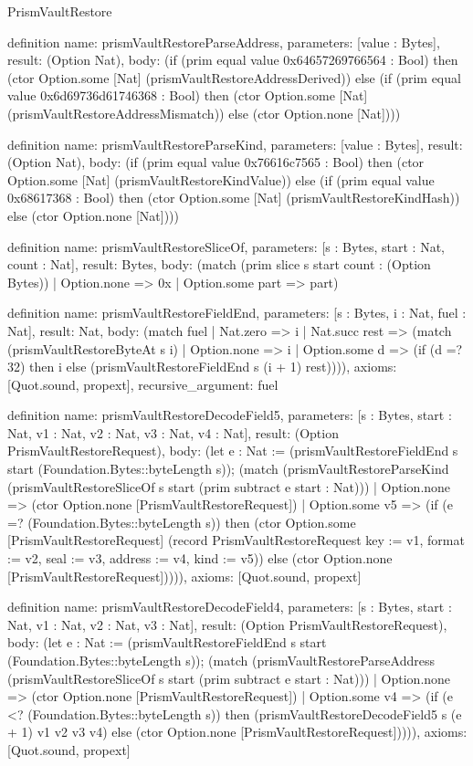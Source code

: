 \begin{lexlean}{PrismVaultRestore}
\begin{semanticmodule}
definition{
  name: prismVaultRestoreParseAddress,
  parameters: [value : Bytes],
  result: (Option Nat),
  body: (if (prim equal value 0x64657269766564 : Bool) then (ctor Option.some [Nat] (prismVaultRestoreAddressDerived)) else (if (prim equal value 0x6d69736d61746368 : Bool) then (ctor Option.some [Nat] (prismVaultRestoreAddressMismatch)) else (ctor Option.none [Nat])))
}

definition{
  name: prismVaultRestoreParseKind,
  parameters: [value : Bytes],
  result: (Option Nat),
  body: (if (prim equal value 0x76616c7565 : Bool) then (ctor Option.some [Nat] (prismVaultRestoreKindValue)) else (if (prim equal value 0x68617368 : Bool) then (ctor Option.some [Nat] (prismVaultRestoreKindHash)) else (ctor Option.none [Nat])))
}

definition{
  name: prismVaultRestoreSliceOf,
  parameters: [s : Bytes, start : Nat, count : Nat],
  result: Bytes,
  body: (match (prim slice s start count : (Option Bytes))
    | Option.none => 0x
    | Option.some part => part)
}

definition{
  name: prismVaultRestoreFieldEnd,
  parameters: [s : Bytes, i : Nat, fuel : Nat],
  result: Nat,
  body: (match fuel
    | Nat.zero => i
    | Nat.succ rest => (match (prismVaultRestoreByteAt s i)
      | Option.none => i
      | Option.some d => (if (d =? 32) then i else (prismVaultRestoreFieldEnd s (i + 1) rest)))),
  axioms: [Quot.sound, propext],
  recursive_argument: fuel
}

definition{
  name: prismVaultRestoreDecodeField5,
  parameters: [s : Bytes, start : Nat, v1 : Nat, v2 : Nat, v3 : Nat, v4 : Nat],
  result: (Option PrismVaultRestoreRequest),
  body: (let e : Nat := (prismVaultRestoreFieldEnd s start (Foundation.Bytes::byteLength s)); (match (prismVaultRestoreParseKind (prismVaultRestoreSliceOf s start (prim subtract e start : Nat)))
    | Option.none => (ctor Option.none [PrismVaultRestoreRequest])
    | Option.some v5 => (if (e =? (Foundation.Bytes::byteLength s)) then (ctor Option.some [PrismVaultRestoreRequest] (record PrismVaultRestoreRequest {key := v1, format := v2, seal := v3, address := v4, kind := v5})) else (ctor Option.none [PrismVaultRestoreRequest])))),
  axioms: [Quot.sound, propext]
}

definition{
  name: prismVaultRestoreDecodeField4,
  parameters: [s : Bytes, start : Nat, v1 : Nat, v2 : Nat, v3 : Nat],
  result: (Option PrismVaultRestoreRequest),
  body: (let e : Nat := (prismVaultRestoreFieldEnd s start (Foundation.Bytes::byteLength s)); (match (prismVaultRestoreParseAddress (prismVaultRestoreSliceOf s start (prim subtract e start : Nat)))
    | Option.none => (ctor Option.none [PrismVaultRestoreRequest])
    | Option.some v4 => (if (e <? (Foundation.Bytes::byteLength s)) then (prismVaultRestoreDecodeField5 s (e + 1) v1 v2 v3 v4) else (ctor Option.none [PrismVaultRestoreRequest])))),
  axioms: [Quot.sound, propext]
}


\end{semanticmodule}
\end{lexlean}
